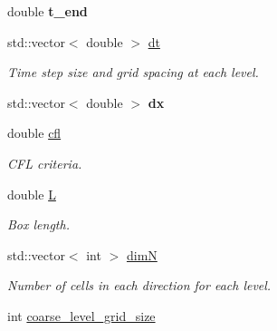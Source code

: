 \begin{DoxyCompactItemize}
double {\bfseries t\+\_\+end}
\item 
\mbox{\label{classsledgehamr_1_1Sledgehamr_a9239f0c77e572cc155e33f602c19b8dc}} 
std\+::vector$<$ double $>$ \mbox{\hyperlink{classsledgehamr_1_1Sledgehamr_a9239f0c77e572cc155e33f602c19b8dc}{dt}}
\begin{DoxyCompactList}\small\item\em Time step size and grid spacing at each level. \end{DoxyCompactList}\item 
\mbox{\label{classsledgehamr_1_1Sledgehamr_a50a57ffa146126e84ebe8c3786e7e162}} 
std\+::vector$<$ double $>$ {\bfseries dx}
\item 
\mbox{\label{classsledgehamr_1_1Sledgehamr_ae63f7440e3ecaac50023872f8aa23d80}} 
double \mbox{\hyperlink{classsledgehamr_1_1Sledgehamr_ae63f7440e3ecaac50023872f8aa23d80}{cfl}}
\begin{DoxyCompactList}\small\item\em C\+FL criteria. \end{DoxyCompactList}\item 
\mbox{\label{classsledgehamr_1_1Sledgehamr_a3b6cac62b23df3148a59a516f4aab93b}} 
double \mbox{\hyperlink{classsledgehamr_1_1Sledgehamr_a3b6cac62b23df3148a59a516f4aab93b}{L}}
\begin{DoxyCompactList}\small\item\em Box length. \end{DoxyCompactList}\item 
\mbox{\label{classsledgehamr_1_1Sledgehamr_a7cd2ed06ec7cffa965017fc3858948e3}} 
std\+::vector$<$ int $>$ \mbox{\hyperlink{classsledgehamr_1_1Sledgehamr_a7cd2ed06ec7cffa965017fc3858948e3}{dimN}}
\begin{DoxyCompactList}\small\item\em Number of cells in each direction for each level. \end{DoxyCompactList}\item 
\mbox{\label{classsledgehamr_1_1Sledgehamr_a67d75bdf0fb15f5cfba92a081e694e2b}} 
int \mbox{\hyperlink{classsledgehamr_1_1Sledgehamr_a67d75bdf0fb15f5cfba92a081e694e2b}{coarse\+\_\+level\+\_\+grid\+\_\+size}}

\end{DoxyCompactItemize}

